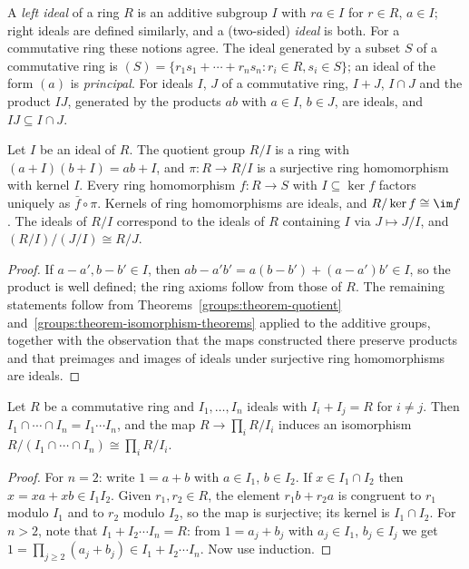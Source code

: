 \begin{definition}\label{rings:definition-ideal}
A \emph{left ideal} of a ring $R$ is an additive subgroup $I$ with $ra \in I$ for
$r \in R$, $a \in I$; right ideals are defined similarly, and a (two-sided)
\emph{ideal} is both. For a commutative ring these notions agree. The ideal
generated by a subset $S$ of a commutative ring is
$(S) = \{r_1 s_1 + \cdots + r_n s_n : r_i \in R, s_i \in S\}$; an ideal of the form
$(a)$ is \emph{principal}. For ideals $I$, $J$ of a commutative ring, $I + J$,
$I \cap J$ and the product $IJ$, generated by the products $ab$ with $a \in I$,
$b \in J$, are ideals, and $IJ \subseteq I \cap J$.
\end{definition}

\begin{theorem}\label{rings:theorem-quotient-ring}
Let $I$ be an ideal of $R$. The quotient group $R/I$ is a ring with
$(a + I)(b + I) = ab + I$, and $\pi \colon R \to R/I$ is a surjective ring homomorphism
with kernel $I$. Every ring homomorphism $f \colon R \to S$ with $I \subseteq \ker f$ factors
uniquely as $\bar f \circ \pi$. Kernels of ring homomorphisms are ideals, and
$R/\ker f \cong \im f$. The ideals of $R/I$ correspond to the ideals of $R$ containing
$I$ via $J \mapsto J/I$, and $(R/I)/(J/I) \cong R/J$.
\end{theorem}

\begin{proof}
If $a - a', b - b' \in I$, then $ab - a'b' = a(b - b') + (a - a')b' \in I$, so the
product is well defined; the ring axioms follow from those of $R$. The remaining
statements follow from Theorems~\ref{groups:theorem-quotient}
and~\ref{groups:theorem-isomorphism-theorems} applied to the additive groups,
together with the observation that the maps constructed there preserve products
and that preimages and images of ideals under surjective ring homomorphisms are
ideals.
\end{proof}

\begin{theorem}\label{rings:theorem-chinese-remainder}
Let $R$ be a commutative ring and $I_1, \ldots, I_n$ ideals with $I_i + I_j = R$ for
$i \neq j$. Then $I_1 \cap \cdots \cap I_n = I_1 \cdots I_n$, and the map
$R \to \prod_i R/I_i$ induces an isomorphism $R/(I_1 \cap \cdots \cap I_n) \cong \prod_i R/I_i$.
\end{theorem}

\begin{proof}
For $n = 2$: write $1 = a + b$ with $a \in I_1$, $b \in I_2$. If $x \in I_1 \cap I_2$ then
$x = xa + xb \in I_1I_2$. Given $r_1, r_2 \in R$, the element $r_1 b + r_2 a$ is congruent
to $r_1$ modulo $I_1$ and to $r_2$ modulo $I_2$, so the map is surjective; its kernel
is $I_1 \cap I_2$. For $n > 2$, note that $I_1 + I_2 \cdots I_n = R$: from
$1 = a_j + b_j$ with $a_j \in I_1$, $b_j \in I_j$ we get
$1 = \prod_{j \geq 2}(a_j + b_j) \in I_1 + I_2 \cdots I_n$. Now use induction.
\end{proof}

